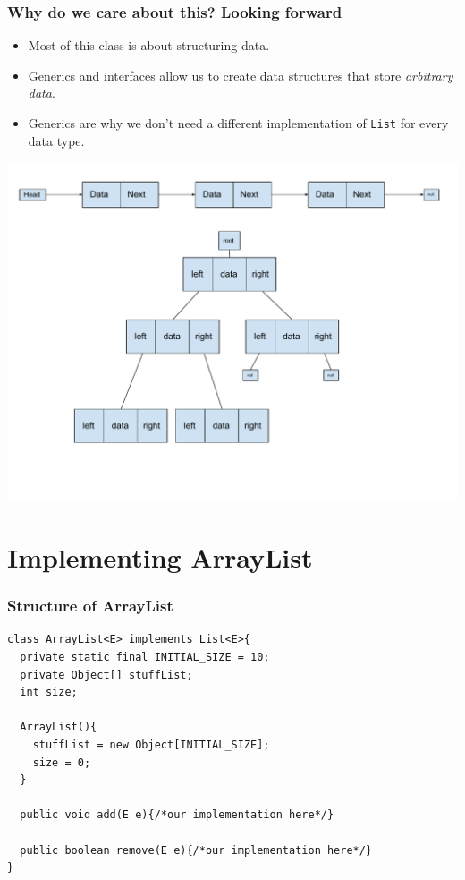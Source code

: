 \documentclass{beamer}
\begin{document}
\begin{frame}[fragile]
    \frametitle{Why do we care about this? Looking forward}
    \begin{minipage}{0.39\textwidth}
        \begin{itemize}
            \item Most of this class is about structuring data.
            \item Generics and interfaces allow us to create data structures that store \textit{arbitrary data}.
            \item Generics are why we don't need a different implementation of \lstinline|List| for every data type.
        \end{itemize}
    \end{minipage}
    \hfill
    \begin{minipage}{0.59\textwidth}
        \includegraphics[width=\textwidth]{./imgs/ds.pdf}
    \end{minipage}
\end{frame}

\section{Implementing ArrayList}

\begin{frame}[fragile]
    \frametitle{Structure of ArrayList}
        \begin{lstlisting}[basicstyle=\small]
class ArrayList<E> implements List<E>{
  private static final INITIAL_SIZE = 10;
  private Object[] stuffList;
  int size;

  ArrayList(){
    stuffList = new Object[INITIAL_SIZE];
    size = 0;
  }

  public void add(E e){/*our implementation here*/}

  public boolean remove(E e){/*our implementation here*/}
}
        \end{lstlisting}
\end{frame}
\end{document}
